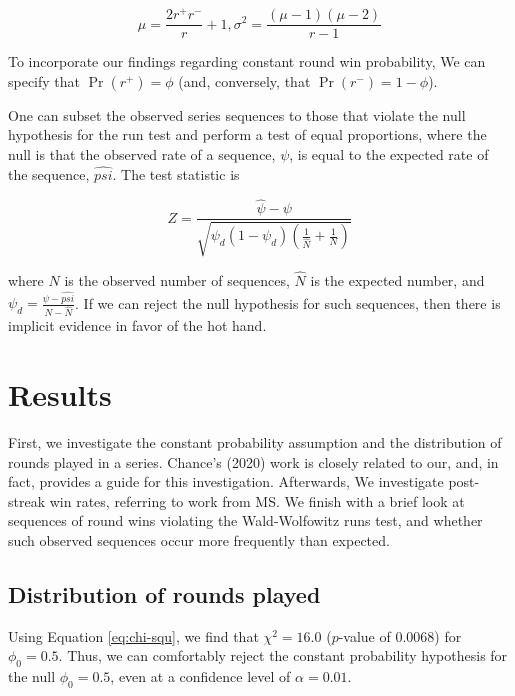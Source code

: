 \documentclass{article}
\begin{document}
\begin{equation}\label{eq:ww}
\mu = \frac{2r^{+}r^{-}}{r} + 1, \sigma^2 = \frac{(\mu-1)(\mu-2)}{r-1}
\end{equation}

To incorporate our findings regarding constant round win probability, We
can specify that \(\Pr(r^+) = \phi\) (and, conversely, that
\(\Pr(r^-) = 1 - \phi\)).

One can subset the observed series sequences to those that violate the
null hypothesis for the run test and perform a test of equal
proportions, where the null is that the observed rate of a sequence,
\(\psi\), is equal to the expected rate of the sequence, \(\hat{psi}\).
The test statistic is

\begin{equation}\label{eq:prop}
Z = \frac{\hat{\psi} - \psi}{\sqrt{\psi_d (1 - \psi_d) ( \frac{1}{\hat{N}} + \frac{1}{N})}}
\end{equation}

where \(N\) is the observed number of sequences, \(\hat{N}\) is the
expected number, and \(\psi_d = \frac{\psi - \hat{psi}}{N - \hat{N}}\).
If we can reject the null hypothesis for such sequences, then there is
implicit evidence in favor of the hot hand.

\hypertarget{results}{%
\section{Results}\label{results}}

First, we investigate the constant probability assumption and the
distribution of rounds played in a series. Chance's (2020) work is
closely related to our, and, in fact, provides a guide for this
investigation. Afterwards, We investigate post-streak win rates,
referring to work from MS. We finish with a brief look at sequences of
round wins violating the Wald-Wolfowitz runs test, and whether such
observed sequences occur more frequently than expected.

\hypertarget{distribution-of-rounds-played-1}{%
\subsection{Distribution of rounds
played}\label{distribution-of-rounds-played-1}}

Using Equation \ref{eq:chi-squ}, we find that \(\chi^2 = 16.0\)
(\(p\)-value of 0.0068) for \(\phi_0 = 0.5\). Thus, we can comfortably
reject the constant probability hypothesis for the null
\(\phi_0 = 0.5\), even at a confidence level of \(\alpha = 0.01\).
\end{document}
